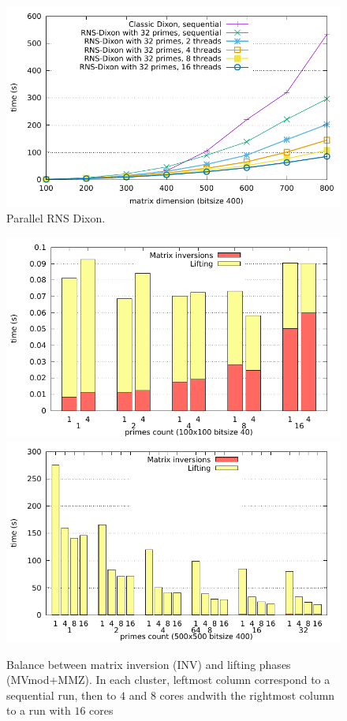 \begin{figure}[htb]
\begin{center}
  \includegraphics[width=.8\textwidth]{Pictures/RNSDixon/parallel-threads}
\end{center}
\caption{Parallel RNS Dixon.}\label{fig:rnsdixon_parallel_threads}
\end{figure}

\begin{figure}[htb]
\begin{center}
  \includegraphics[width=.8\textwidth]{Pictures/RNSDixon/parallel-detailed_100n_40b}
  \includegraphics[width=.8\textwidth]{Pictures/RNSDixon/parallel-detailed_500n_400b_total}
\end{center}
\caption{Balance between matrix inversion (INV) and lifting phases
  (MVmod+MMZ). In each cluster, leftmost column correspond to a
  sequential run, then to $4$ and $8$ cores andwith the rightmost
column to a run with $16$ cores}\label{fig:rnsdixon_parallel}
\end{figure}

